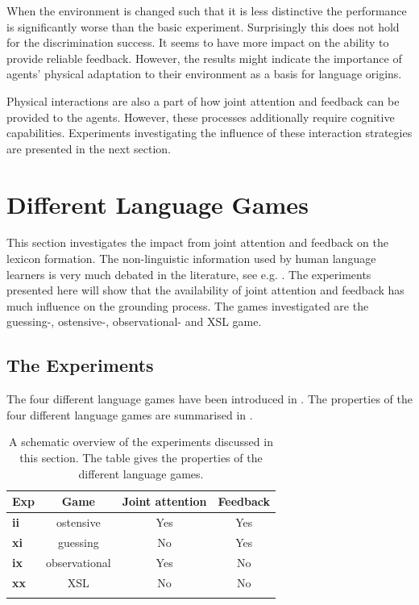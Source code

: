 When the environment is changed such that it is less distinctive the performance is significantly worse than the basic experiment. Surprisingly this does not hold for the discrimination success. It seems to have more impact on the ability to provide reliable feedback. However, the results might indicate the importance of agents' physical adaptation to their environment as a basis for language origins.


Physical interactions are also a part of how joint attention and feedback can be provided to the agents. However, these processes additionally require cognitive capabilities. Experiments investigating the influence of these interaction strategies are presented in the next section.


\section{Different Language Games}\label{s:par:feed}

This section investigates the impact from joint attention and feedback on the lexicon formation. The non-linguistic information used by human language learners is very much debated in the literature, see e.g. \citep{bowerman:1988,barrett:1995}. The experiments presented here will show that the availability of joint attention and feedback has much influence on the grounding process. The games investigated are the guessing-, ostensive-, observational- and XSL game.


\subsection{The Experiments}

The four different language games have been introduced in . The properties of the four different language games are summarised in .

\begin{table}[h]
\centering
\begin{tabular}{lccc}
\lsptoprule
Exp & Game & Joint attention & Feedback\\
\midrule
{\bf ii} & ostensive & Yes & Yes\\
{\bf xi} & guessing & No & Yes\\
{\bf ix} & observational & Yes & No\\
{\bf xx} & XSL & No & No\\
\lspbottomrule
\end{tabular}
\caption{A schematic overview of the experiments discussed in this section. The table gives the properties of the different language games.}
\label{t:par:lg}
\end{table}


